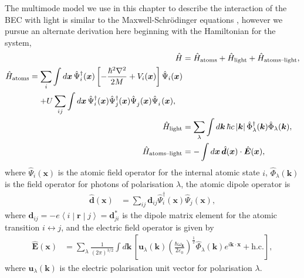 The multimode model we use in this chapter to describe the interaction of the BEC with light is similar to the Maxwell-Schrödinger equations \citep{Zobay:2005,Zobay:2006}, however we pursue an alternate derivation here beginning with the Hamiltonian for the system,
\begin{subequations}
    \label{OpticalPumping:AtomLightHamiltonian}
    \begin{align}
        \hat{H} &= \hat{H}_\text{atoms} + \hat{H}_\text{light} + \hat{H}_\text{atoms--light}, \\
        \begin{split}
            \hat{H}_\text{atoms} &= \sum_i \int d \bm{x}\, \hat{\Psi}_i^\dagger(\bm{x}) \left[ - \frac{\hbar^2 \nabla^2}{2 M} + V_i(\bm{x}) \right] \hat{\Psi}_i(\bm{x}) \\
            &\relphantom{=} + U \sum_{ij}\int d \bm{x}\, \hat{\Psi}_i^\dagger(\bm{x}) \hat{\Psi}_j^\dagger(\bm{x}) \hat{\Psi}_j^{\phantom{\dagger}}(\bm{x}) \hat{\Psi}_i^{\phantom{\dagger}}(\bm{x}),
        \end{split}\\
        \hat{H}_\text{light} &= \sum_\lambda \int d \bm{k}\, \hbar c \abs{\bm{k}} \hat{\Phi}_\lambda^\dagger(\bm{k}) \hat{\Phi}_\lambda(\bm{k}), \\
        \hat{H}_\text{atoms--light} &= - \int d \bm{x}\, \hat{\bm{d}}(\bm{x}) \cdot \hat{\bm{E}}(\bm{x}), \label{OpticalPumping:AtomLightCouplingHamiltonian}
    \end{align}
\end{subequations}
where $\hat{\Psi}_i(\bm{x})$ is the atomic field operator for the internal atomic state $i$, $\hat{\Phi}_\lambda(\bm{k})$ is the field operator for photons of polarisation $\lambda$, the atomic dipole operator is
\begin{align}
    \hat{\bm{d}}(\bm{x}) &= \sum_{ij}\bm{d}_{ij} \hat{\Psi}_i^\dagger(\bm{x}) \hat{\Psi}_j^{\phantom{\dagger}}(\bm{x}),
\end{align}
where $\bm{d}_{ij} = -e\left<i\middle|\bm{r}\middle|j\right> = \bm{d}^*_{ji}$ is the dipole matrix element for the atomic transition $i \leftrightarrow j$, and the electric field operator is given by
\begin{align}
    \hat{\bm{E}}(\bm{x}) &= \sum_\lambda \frac{1}{(2\pi)^{3/2}} \int d \bm{k}\, \left[\bm{u}_\lambda(\bm{k}) \left(\frac{\hbar \omega_{\bm{k}}}{2\varepsilon_0} \right)^{\frac{1}{2}} \hat{\Phi}_\lambda(\bm{k}) e^{i \bm{k} \cdot \bm{x}} + \text{h.c.}\right],
\end{align}
where $\bm{u}_\lambda(\bm{k})$ is the electric polarisation unit vector for polarisation $\lambda$.

